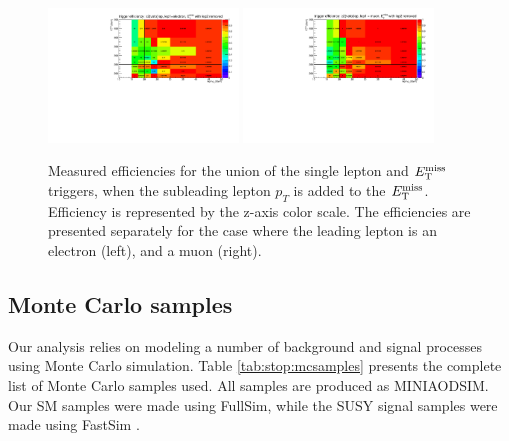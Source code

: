 \begin{figure}[htb]
\centering
\includegraphics[width=0.45\textwidth]{figures/TriggerEff2l_el.pdf}
\includegraphics[width=0.45\textwidth]{figures/TriggerEff2l_mu.pdf}
\caption{Measured efficiencies for the union of the single lepton and
  $E_\text{T}^\text{miss}$ triggers, when the subleading lepton $p_T$ is added to the
  $E_\text{T}^\text{miss}$. Efficiency is represented by the z-axis color scale. The
  efficiencies are presented separately for the case where
  the leading lepton is an electron (left), and a muon (right).}
\label{fig:stop:trigeff:2ndlepplusmet}
\end{figure}


\subsection{Monte Carlo samples}
\label{ssec:stop:mcsamples}

Our analysis relies on modeling a number of background and signal
processes using Monte Carlo simulation. Table \ref{tab:stop:mcsamples}
presents the complete list of Monte Carlo samples used. All samples
are produced as MINIAODSIM. Our SM samples were made using FullSim,
while the SUSY signal samples were made using FastSim \cite{fastsim}.

